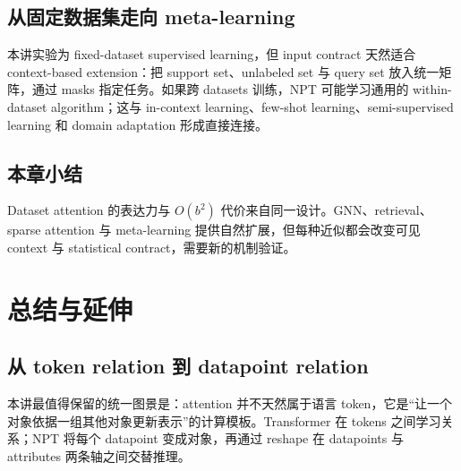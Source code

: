 \documentclass[a4paper]{article}
\begin{document}
\subsection{从固定数据集走向 meta-learning}

本讲实验为 fixed-dataset supervised learning，但 input contract 天然适合 context-based extension：把 support set、unlabeled set 与 query set 放入统一矩阵，通过 masks 指定任务。如果跨 datasets 训练，NPT 可能学习通用的 within-dataset algorithm；这与 in-context learning、few-shot learning、semi-supervised learning 和 domain adaptation 形成直接连接。


\subsection{本章小结}

Dataset attention 的表达力与 $O(b^2)$ 代价来自同一设计。GNN、retrieval、sparse attention 与 meta-learning 提供自然扩展，但每种近似都会改变可见 context 与 statistical contract，需要新的机制验证。

\section{总结与延伸}

\subsection{从 token relation 到 datapoint relation}

本讲最值得保留的统一图景是：attention 并不天然属于语言 token，它是“让一个对象依据一组其他对象更新表示”的计算模板。Transformer 在 tokens 之间学习关系；NPT 将每个 datapoint 变成对象，再通过 reshape 在 datapoints 与 attributes 两条轴之间交替推理。
\end{document}
